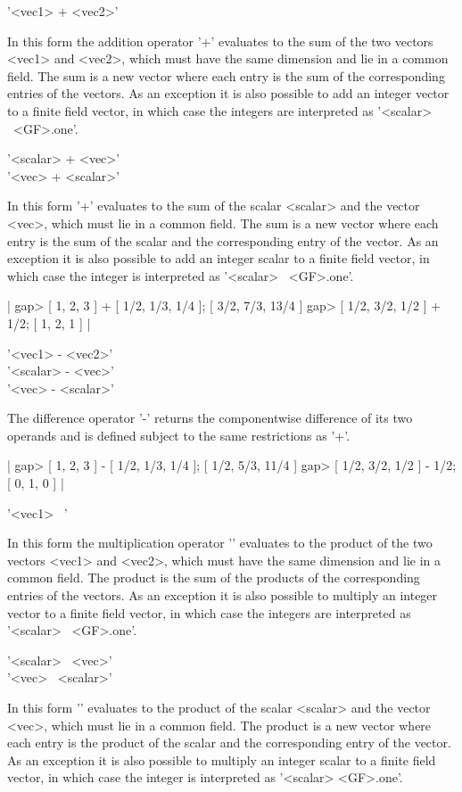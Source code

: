 '<vec1> + <vec2>'

In this form the addition operator '+'  evaluates to  the sum  of the two
vectors <vec1> and <vec2>, which must have the same  dimension and lie in
a common field.  The sum is a new  vector where each entry  is the sum of
the corresponding entries  of the vectors.  As an  exception it  is  also
possible to add an integer vector to a finite field vector, in which case
the integers are interpreted as '<scalar> \*\ <GF>.one'.

'<scalar> + <vec>' \\
'<vec> + <scalar>'

In  this form '+' evaluates  to the  sum of the   scalar <scalar> and the
vector <vec>, which must lie in a common field.  The sum is  a new vector
where each entry is the sum of the scalar and the  corresponding entry of
the vector.  As an exception it is also possible to add an integer scalar
to a finite field  vector, in  which case  the integer  is interpreted as
'<scalar> \*\ <GF>.one'.

|    gap> [ 1, 2, 3 ] + [ 1/2, 1/3, 1/4 ];
    [ 3/2, 7/3, 13/4 ]
    gap> [ 1/2, 3/2, 1/2 ] + 1/2;
    [ 1, 2, 1 ] |

'<vec1> - <vec2>'  \\
'<scalar> - <vec>' \\
'<vec> - <scalar>'

The difference operator '-'  returns the componentwise difference of  its
two operands and is defined subject to the same restrictions as '+'.

|    gap> [ 1, 2, 3 ] - [ 1/2, 1/3, 1/4 ];
    [ 1/2, 5/3, 11/4 ]
    gap> [ 1/2, 3/2, 1/2 ] - 1/2;
    [ 0, 1, 0 ] |

'<vec1> \*\ <vec2>'

In this form the multiplication operator '\*' evaluates to the product of
the two vectors <vec1> and <vec2>, which must have the same dimension and
lie  in a common field.   The product is  the sum of  the products of the
corresponding entries  of  the vectors.   As  an exception  it   is  also
possible to multiply an integer vector to a finite field vector, in which
case the integers are interpreted as '<scalar> \*\ <GF>.one'.

'<scalar> \*\ <vec>' \\
'<vec> \*\ <scalar>'

In this form '\*' evaluates to the product of the scalar <scalar> and the
vector <vec>, which must lie  in a common field.   The  product  is a new
vector  where   each entry  is   the  product  of   the  scalar  and  the
corresponding entry of the vector.  As an  exception it  is also possible
to multiply an integer scalar to a finite field vector, in which case the
integer is interpreted as '<scalar> \* <GF>.one'.

